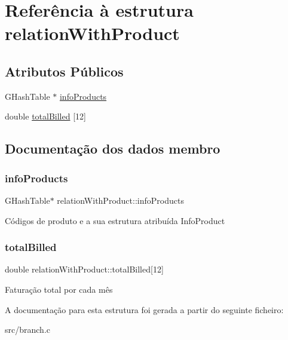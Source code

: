 \hypertarget{structrelationWithProduct}{}\section{Referência à estrutura relation\+With\+Product}
\label{structrelationWithProduct}
\subsection*{Atributos Públicos}
\begin{DoxyCompactItemize}
\item 
G\+Hash\+Table $\ast$ \hyperlink{structrelationWithProduct_a76e3b121e7eaf90cdbb9f2aa0ca39a52}{info\+Products}
\item 
double \hyperlink{structrelationWithProduct_a913d77fd1b3f08ddc69ceca28d0c13f9}{total\+Billed} \mbox{[}12\mbox{]}
\end{DoxyCompactItemize}


\subsection{Documentação dos dados membro}
\mbox{\label{structrelationWithProduct_a76e3b121e7eaf90cdbb9f2aa0ca39a52}} 
\subsubsection{\texorpdfstring{info\+Products}{infoProducts}}
{\footnotesize\ttfamily G\+Hash\+Table$\ast$ relation\+With\+Product\+::info\+Products}

Códigos de produto e a sua estrutura atribuída Info\+Product \mbox{\label{structrelationWithProduct_a913d77fd1b3f08ddc69ceca28d0c13f9}} 
\subsubsection{\texorpdfstring{total\+Billed}{totalBilled}}
{\footnotesize\ttfamily double relation\+With\+Product\+::total\+Billed\mbox{[}12\mbox{]}}

Faturação total por cada mês 

A documentação para esta estrutura foi gerada a partir do seguinte ficheiro\+:\begin{DoxyCompactItemize}
\item 
src/branch.\+c\end{DoxyCompactItemize}
